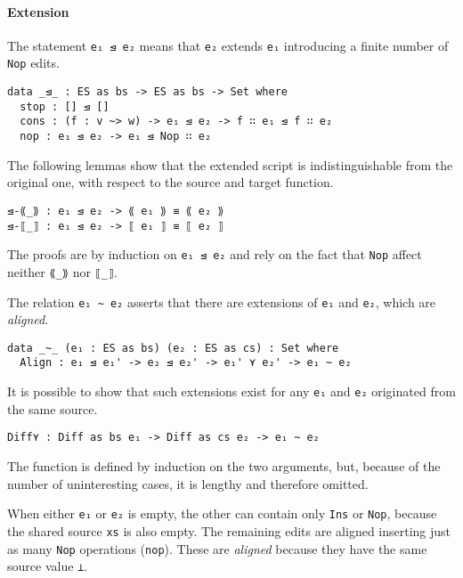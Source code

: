 \documentclass[../Thesis.tex]{subfiles}
\begin{document}
	\paragraph{Extension}	
	The statement \texttt{e₁ ⊴ e₂} means that \texttt{e₂} extends \texttt{e₁}
	introducing a finite number of \texttt{Nop} edits.
	
\begin{verbatim}
data _⊴_ : ES as bs -> ES as bs -> Set where
  stop : [] ⊴ []
  cons : (f : v ~> w) -> e₁ ⊴ e₂ -> f ∷ e₁ ⊴ f ∷ e₂
  nop : e₁ ⊴ e₂ -> e₁ ⊴ Nop ∷ e₂
\end{verbatim}
		
	The following lemmas show that the extended script is 
	indistinguishable from the original one, with respect to
	the source and target function.
	
\begin{verbatim}
⊴-⟪_⟫ : e₁ ⊴ e₂ -> ⟪ e₁ ⟫ ≡ ⟪ e₂ ⟫
⊴-⟦_⟧ : e₁ ⊴ e₂ -> ⟦ e₁ ⟧ ≡ ⟦ e₂ ⟧
\end{verbatim}

	The proofs are by induction on \texttt{e₁ ⊴ e₂} and rely on the fact that
	\texttt{Nop} affect neither \texttt{⟪\_⟫} nor \texttt{⟦\_⟧}.
	
	The relation \texttt{e₁ \textasciitilde\ e₂} asserts that there are
	extensions of \texttt{e₁} and \texttt{e₂}, which are \emph{aligned}.
	
\begin{verbatim}
data _~_ (e₁ : ES as bs) (e₂ : ES as cs) : Set where
  Align : e₁ ⊴ e₁' -> e₂ ⊴ e₂' -> e₁' ⋎ e₂' -> e₁ ~ e₂
\end{verbatim}
	
	It is possible to show that such extensions exist for any \texttt{e₁} 
	and \texttt{e₂} 	originated from the same source. 
	
\begin{verbatim}
Diff⋎ : Diff as bs e₁ -> Diff as cs e₂ -> e₁ ~ e₂
\end{verbatim}
	The function is defined by induction on the two arguments,
	but, because of the number of uninteresting cases, it is lengthy 
	and therefore omitted.

	When either \texttt{e₁} or \texttt{e₂} is empty, the other can contain
	only \texttt{Ins} or \texttt{Nop}, because the shared source \texttt{xs} is
	also empty. The remaining edits are aligned
	inserting just as many \texttt{Nop} operations (\texttt{nop}). 
	These are \emph{aligned} because they have the same source value 
	\texttt{⊥}.
	
\end{document}
